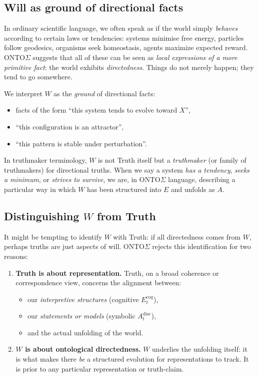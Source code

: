 \documentclass[12pt,a4paper]{report}
\newcommand{\Will}{W}
\begin{document}
\subsection*{Will as ground of directional facts}

In ordinary scientific language, we often speak as if the world simply \emph{behaves} according to certain laws or tendencies: systems minimise free energy, particles follow geodesics, organisms seek homeostasis, agents maximize expected reward. ONTO$\Sigma$ suggests that all of these can be seen as \emph{local expressions of a more primitive fact}: the world exhibits \emph{directedness}. Things do not merely happen; they tend to go somewhere.

We interpret \(\Will\) as the \emph{ground} of directional facts:

\begin{itemize}[leftmargin=2em]
    \item facts of the form ``this system tends to evolve toward $X$'',
    \item ``this configuration is an attractor'',
    \item ``this pattern is stable under perturbation''.
\end{itemize}

In truthmaker terminology, \(\Will\) is not Truth itself but a \emph{truthmaker} (or family of truthmakers) for directional truths. When we say a system \emph{has a tendency}, \emph{seeks a minimum}, or \emph{strives to survive}, we are, in ONTO$\Sigma$ language, describing a particular way in which \(\Will\) has been structured into \(E\) and unfolds as \(A\).

\subsection*{Distinguishing \texorpdfstring{$W$}{W} from Truth}

It might be tempting to identify \(\Will\) with Truth: if all directedness comes from \(\Will\), perhaps truths are just aspects of will. ONTO$\Sigma$ rejects this identification for two reasons:

\begin{enumerate}[leftmargin=2em]
    \item \textbf{Truth is about representation.} Truth, on a broad coherence or correspondence view, concerns the alignment between:
    \begin{itemize}
        \item our \emph{interpretive structures} (cognitive \(E_t^{\mathrm{cog}}\)),
        \item our \emph{statements or models} (symbolic \(A_t^{\mathrm{disc}}\)),
        \item and the actual unfolding of the world.
    \end{itemize}
    \item \textbf{\(\Will\) is about ontological directedness.} \(\Will\) underlies the unfolding itself: it is what makes there \emph{be} a structured evolution for representations to track. It is prior to any particular representation or truth-claim.
\end{enumerate}
\end{document}
